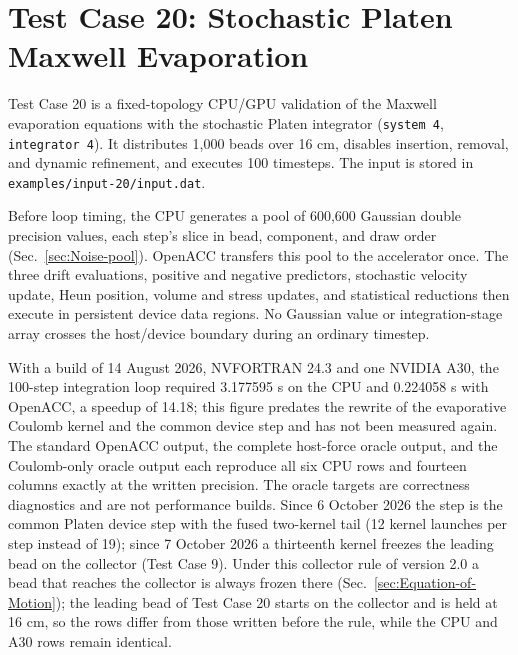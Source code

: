 \section{Test Case 20: Stochastic Platen Maxwell Evaporation}

Test Case 20 is a fixed-topology CPU/GPU validation of the Maxwell
evaporation equations with the stochastic Platen integrator
(\texttt{system 4}, \texttt{integrator 4}). It distributes 1,000 beads over
16 cm, disables insertion, removal, and dynamic refinement, and executes 100
timesteps. The input is stored in
\texttt{examples/input-20/input.dat}.

Before loop timing, the CPU generates a pool of 600,600 Gaussian double
precision values, each step's slice in bead, component, and draw order
(Sec.~\ref{sec:Noise-pool}). OpenACC transfers this pool to the accelerator
once. The three drift evaluations,
positive and negative predictors, stochastic velocity update, Heun position,
volume and stress updates, and statistical reductions then execute in
persistent device data regions. No Gaussian value or integration-stage array
crosses the host/device boundary during an ordinary timestep.

With a build of 14 August 2026, NVFORTRAN 24.3 and one NVIDIA A30, the
100-step integration loop required 3.177595 s on the CPU and 0.224058 s with
OpenACC, a speedup of 14.18; this figure predates the rewrite of the
evaporative Coulomb kernel and the common device step and has not been
measured again. The standard OpenACC output, the complete host-force oracle
output, and the Coulomb-only oracle output each reproduce all six CPU rows
and fourteen columns exactly at the written precision. The oracle targets are correctness
diagnostics and are not performance builds. Since 6 October 2026 the step is
the common Platen device step with the fused two-kernel tail (12 kernel
launches per step instead of 19); since 7 October 2026 a thirteenth kernel
freezes the leading bead on the collector (Test Case 9). Under this
collector rule of version 2.0 a bead that reaches the collector is always
frozen there (Sec.~\ref{sec:Equation-of-Motion}); the leading bead of Test
Case 20 starts on the collector and is held at 16 cm, so the rows differ
from those written before the rule, while the CPU and A30 rows remain
identical.
